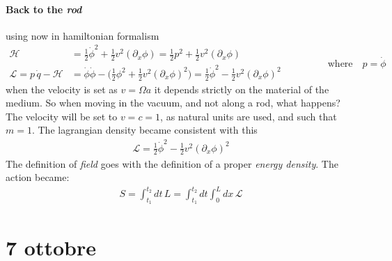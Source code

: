 \documentclass[class=article]{standalone}
\begin{document}
\paragraph{Back to the \emph{rod}} using now in hamiltonian formalism
\begin{equation*}
\begin{split}
\mathcal{H} & = \frac{1}{2} \dot \phi^2 + \frac{1}{2} v^2 (\partial_x \phi) 
= \frac{1}{2} p^2 + \frac{1}{2} v^2 (\partial_x \phi) \\
\mathcal{L}  = p \, \dot q - \mathcal{H} & = \dot\phi \dot\phi - \Big( \frac{1}{2} \phi^2  +  \frac{1}{2} v^2 (\partial_x \phi)^2  \Big) 
= \frac{1}{2} \dot \phi^2 - \frac{1}{2} v^2 (\partial_x \phi)^2 
\end{split}\quad\quad\quad\quad
\begin{split}
\mbox{where}\quad p = \dot \phi 
\end{split}
\end{equation*}
when the velocity is set as $v = \Omega a$ it depends strictly on the material of the medium.
So when moving in the vacuum, and not along a rod, what happens? 
The velocity will be set to $v = c = 1$, as natural units are used, and  such that $m=1$.
The lagrangian density became consistent with this
\begin{equation*}
\begin{split}
\mathcal{L} = \frac{1}{2} \dot \phi^2 - \frac{1}{2} v^2 (\partial_x \phi)^2 
\end{split}
\end{equation*}
The definition of \emph{field} goes with the definition of a proper \emph{energy density}.
The action became:
\begin{equation*}
\begin{split}
S = \int_{t_1}^{t_2} dt \, L =  \int_{t_1}^{t_2} dt \int_0^L dx \, \mathcal{L}
\end{split}
\end{equation*}


























\newpage
\section{7 ottobre}
\end{document}
